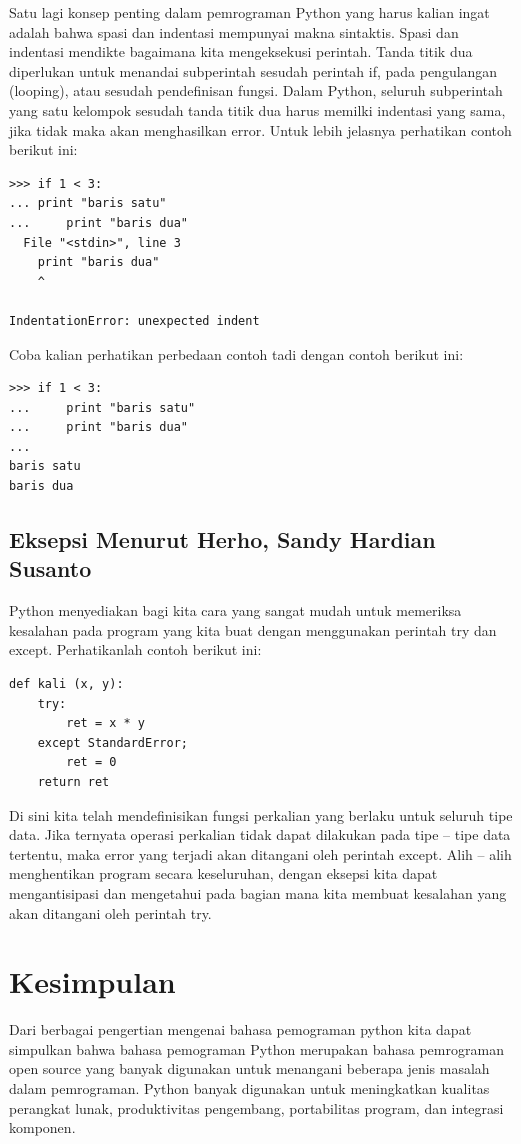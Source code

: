 \documentclass[12pt]{article}
\begin{document}
Satu lagi konsep penting dalam pemrograman Python yang harus kalian ingat adalah bahwa spasi dan indentasi mempunyai makna sintaktis. Spasi dan indentasi mendikte bagaimana kita mengeksekusi perintah. Tanda titik dua diperlukan untuk menandai subperintah sesudah perintah if, pada pengulangan (looping), atau sesudah pendefinisan fungsi. Dalam Python, seluruh subperintah yang satu kelompok sesudah tanda titik dua harus memilki indentasi yang sama, jika tidak maka akan menghasilkan error. Untuk lebih jelasnya perhatikan contoh berikut ini:

\begin{verbatim}
>>> if 1 < 3:
... print "baris satu"
... 	print "baris dua"
  File "<stdin>", line 3
    print "baris dua"
    ^
    
IndentationError: unexpected indent
\end{verbatim}

Coba kalian perhatikan perbedaan contoh tadi dengan contoh berikut ini:

\begin{verbatim}
>>> if 1 < 3:
... 	print "baris satu"
... 	print "baris dua"
...
baris satu
baris dua
\end{verbatim}

\subsection{Eksepsi Menurut Herho, Sandy Hardian Susanto}
Python menyediakan bagi kita cara yang sangat mudah untuk memeriksa kesalahan pada program yang kita buat dengan menggunakan perintah try dan except. Perhatikanlah contoh berikut ini:
\begin{verbatim}
def kali (x, y):
	try:
		ret = x * y
	except StandardError;
		ret = 0
	return ret
\end{verbatim}
Di sini kita telah mendefinisikan fungsi perkalian yang berlaku untuk seluruh tipe data. Jika ternyata operasi perkalian tidak dapat dilakukan pada tipe – tipe data tertentu, maka error yang terjadi akan ditangani oleh perintah except. Alih – alih menghentikan program secara keseluruhan, dengan eksepsi kita dapat mengantisipasi dan mengetahui pada bagian mana kita membuat kesalahan yang akan ditangani oleh perintah try\cite{herho2018tutorial}.


\section{Kesimpulan}
	Dari berbagai pengertian mengenai bahasa pemograman python kita dapat simpulkan bahwa bahasa pemograman Python merupakan bahasa pemrograman open source yang banyak digunakan untuk menangani beberapa jenis masalah dalam pemrograman. Python banyak digunakan untuk meningkatkan kualitas perangkat lunak, produktivitas pengembang, portabilitas program, dan integrasi komponen\cite{computingaplikasi}.
	
\end{document}

